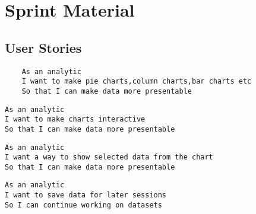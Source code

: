 \section{Sprint Material} %
\label{sec:Sprint Material}
\subsection{User Stories} 
\begin{verbatim}
	As an analytic
	I want to make pie charts,column charts,bar charts etc
	So that I can make data more presentable
\end{verbatim}
\begin{verbatim}
As an analytic
I want to make charts interactive 
So that I can make data more presentable
\end{verbatim}
\begin{verbatim}
As an analytic
I want a way to show selected data from the chart
So that I can make data more presentable
\end{verbatim}
\begin{verbatim}
As an analytic
I want to save data for later sessions
So I can continue working on datasets
\end{verbatim}
